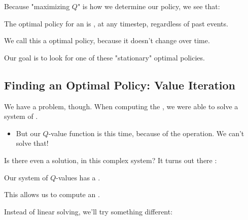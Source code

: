         Because "maximizing $Q$" is how we determine our policy, we see that:\\

        \begin{concept}
            The optimal policy for an  is , at any timestep, regardless of past events.

            We call this a  optimal policy, because it doesn't change over time.
        \end{concept}

        Our goal is to look for one of these "stationary" optimal policies.


    \subsection{Finding an Optimal Policy: Value Iteration}

        We have a problem, though. When computing the , we were able to solve a system of .

        \begin{itemize}
            \item But our $Q$-value function is  this time, because of the  operation. We can't solve that!
        \end{itemize}

        Is there even a solution, in this complex system? It turns out there :\\

        \begin{theorem}
            Our system of $Q$-values has a .

            This allows us to compute an .
        \end{theorem}


        \subsecdiv

        Instead of linear solving, we'll try something different:

